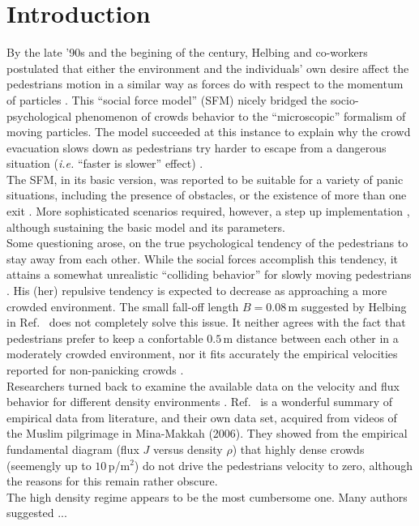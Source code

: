 \section{\label{introduction}Introduction}

By the late '90s and the begining of the century, Helbing and co-workers 
postulated that either the environment and the individuals' own desire affect 
the pedestrians motion in a similar way as forces do with respect to the 
momentum of particles \cite{Helbing1,Helbing4}. This ``social force model'' 
(SFM) nicely bridged the socio-psychological phenomenon of crowds 
behavior to the ``microscopic'' formalism of moving particles. The model 
succeeded at this instance to explain why the crowd evacuation slows down 
as pedestrians try harder to escape from a dangerous situation 
(\textit{i.e.} ``faster is slower'' effect) \cite{Helbing1,Dorso1,Dorso2}. 
  \\ 

The SFM, in its basic version, was reported to be suitable for a variety of 
panic situations, including the presence of obstacles, or the existence of more 
than one exit \cite{Dorso3,Dorso5}. More sophisticated scenarios required, 
however, a step up implementation \cite{Dorso4,Dorso6,Cornes1}, although 
sustaining the basic model and its parameters.  \\

Some questioning arose, on the true psychological tendency of the pedestrians to 
stay away from each other. While the social forces accomplish this tendency, it 
attains a somewhat unrealistic ``colliding behavior'' for slowly moving 
pedestrians \cite{Lakoba}. His (her) repulsive tendency is expected to decrease 
as approaching a more crowded environment. The small fall-off length $B=0.08\,$m 
suggested by Helbing in Ref.~\cite{Helbing1} does not completely solve this 
issue. It neither agrees with the fact that pedestrians prefer to keep a 
confortable $0.5\,$m distance between each other in a moderately crowded 
environment, nor it fits accurately the empirical velocities reported for 
non-panicking crowds \cite{Lakoba}.  \\

Researchers turned back to examine the available data on the velocity and flux 
behavior for different density environments \cite{helbing3,seyfried1}. 
Ref.~\cite{helbing3} is a wonderful summary of empirical data from literature, 
and their own data set, acquired from videos of the Muslim pilgrimage in 
Mina-Makkah (2006). They showed from the empirical fundamental diagram (flux $J$ 
versus density $\rho$) that highly dense crowds (seemengly up to $10\,$p/m$^2$) 
do not drive the pedestrians velocity to zero, although the reasons for this 
remain rather obscure.   \\

The high density regime appears to be the most cumbersome one. Many authors 
suggested ...   \\